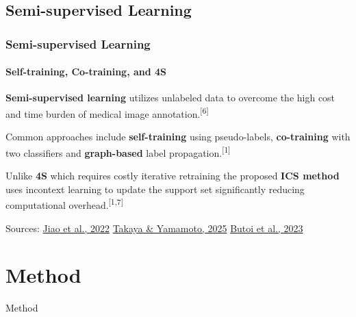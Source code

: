 \documentclass[nometaot,lecture,amberg,toc=twocolumn,indicatelastpageofframe,footlinebox]{OTHAWbeamer}
\begin{document}
\subsection{Semi-supervised Learning}
\begin{frame}[label=relworks2]
    \frametitle{Semi-supervised Learning}
    \framesubtitle{Self-training, Co-training, and 4S}

    \textcolor{orange1}{\textbf{Semi-supervised learning}} utilizes
    unlabeled data to overcome the high cost and time burden of
    medical image annotation.\textsuperscript{[6]}

    \vspace{0.7em}

    Common approaches include \textcolor{orange1}{\textbf{self-training}}
    using pseudo-labels, \textcolor{orange1}{\textbf{co-training}} with
    two classifiers and \textcolor{orange1}{\textbf{graph-based}}
    label propagation.\textsuperscript{[1]}

    \vspace{0.7em}

    Unlike \textbf{4S} which requires costly iterative retraining
    the proposed \textcolor{orange1}{\textbf{ICS method}} uses
    incontext learning to update the support set significantly
    reducing computational overhead.\textsuperscript{[1,7]}

    \vspace{0.3em}
    {\tiny\textcolor{grau2}{Sources: \href{https://arxiv.org/abs/2207.14191}{Jiao et al., 2022} \quad \href{https://arxiv.org/abs/2412.13299}{Takaya \& Yamamoto, 2025} \quad \href{https://universeg.csail.mit.edu/}{Butoi et al., 2023}}}

\end{frame}


\section{Method}
\begin{breakframe}
    Method
\end{breakframe}

\end{document}
